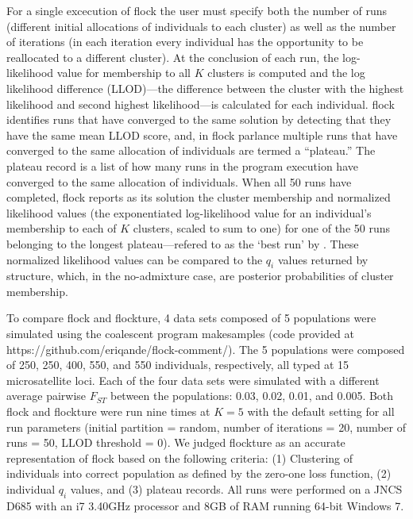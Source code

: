 For a single excecution of {\sc flock} the user must specify both the number of runs 
(different initial allocations of individuals 
to each cluster) as well as the number of iterations (in each iteration every individual 
has the opportunity to be reallocated 
to a different cluster). At the conclusion of each run, the log-likelihood value for 
membership to all $K$ clusters is computed
and the log likelihood difference (LLOD)---the difference between the 
cluster with the highest likelihood 
and second highest likelihood---is calculated for each individual. {\sc flock} 
identifies runs that have converged to the same solution by detecting 
that they have the same mean LLOD score, and, in 
{\sc flock} parlance multiple runs that have converged to the same 
allocation of individuals are termed a ``plateau.'' The plateau record is a list of 
how many runs in the program execution have converged to the same allocation
of individuals.
When all 50  runs have completed, 
{\sc flock} reports as its solution the cluster membership and 
normalized likelihood values (the exponentiated log-likelihood value for an individual's 
membership to each of $K$ clusters, scaled to sum to one) for one of the 50 runs belonging to the 
longest plateau---refered to as the `best run' by \citep{Duc&Tur2012}.
These normalized likelihood values can be compared to the $q_i$ values
returned by {\sc structure}, which, in the no-admixture case, are posterior 
probabilities of cluster membership. 
 

To compare {\sc flock} and {\sc flockture}, 4 data sets composed of 5 populations
were simulated using the coalescent program {\sc makesamples} \citep{Hudson2002} (code provided at 
https://github.com/eriqande/flock-comment/). The 5 populations
were composed of 250, 250, 400, 550, and 550 individuals, respectively, all typed at 15 microsatellite loci.
Each of the four data sets were simulated with a different 
average pairwise $F_{ST}$ between the populations: 0.03, 0.02, 0.01, and 0.005. 
Both {\sc flock} and {\sc flockture} were run nine times at $K=5$ with the default setting for all 
run parameters (initial partition = random, number of iterations = 20, number of runs = 50, 
LLOD threshold = 0). We judged {\sc flockture} as an accurate 
representation of {\sc flock} based on the
following criteria: (1) Clustering of individuals into correct population as
 defined by the zero-one loss function, (2) individual $q_i$ values, and (3) plateau records. 
All runs were performed on a JNCS D685 with an i7 3.40GHz processor and 8GB of 
RAM running 64-bit Windows 7. 

